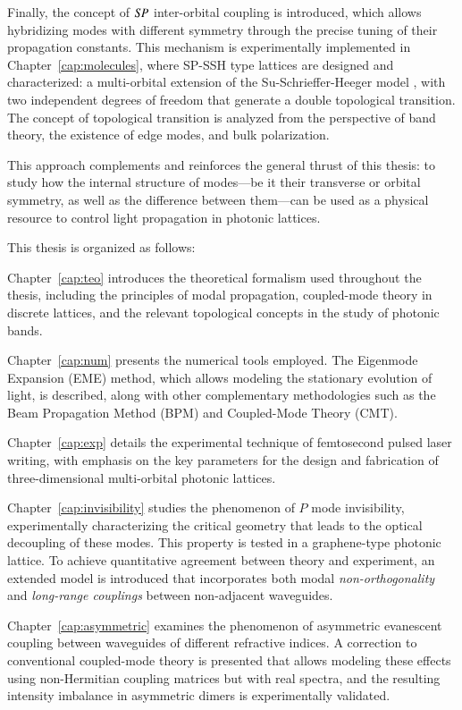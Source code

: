 Finally, the concept of $S\hspace{-0.3ex}P$ inter-orbital coupling is introduced, which allows hybridizing modes with different symmetry through the precise tuning of their propagation constants. This mechanism is experimentally implemented in Chapter~\ref{cap:molecules}, where SP-SSH type lattices are designed and characterized: a multi-orbital extension of the Su-Schrieffer-Heeger model \cite{ssh}, with two independent degrees of freedom that generate a double topological transition. The concept of topological transition is analyzed from the perspective of band theory, the existence of edge modes, and bulk polarization.

This approach complements and reinforces the general thrust of this thesis: to study how the internal structure of modes—be it their transverse or orbital symmetry, as well as the difference between them—can be used as a physical resource to control light propagation in photonic lattices.

\vspace{1em}

This thesis is organized as follows:

Chapter~\ref{cap:teo} introduces the theoretical formalism used throughout the thesis, including the principles of modal propagation, coupled-mode theory in discrete lattices, and the relevant topological concepts in the study of photonic bands.

Chapter~\ref{cap:num} presents the numerical tools employed. The Eigenmode Expansion (EME) method, which allows modeling the stationary evolution of light, is described, along with other complementary methodologies such as the Beam Propagation Method (BPM) and Coupled-Mode Theory (CMT).

Chapter~\ref{cap:exp} details the experimental technique of femtosecond pulsed laser writing, with emphasis on the key parameters for the design and fabrication of three-dimensional multi-orbital photonic lattices.

Chapter~\ref{cap:invisibility} studies the phenomenon of $P$ mode invisibility, experimentally characterizing the critical geometry that leads to the optical decoupling of these modes. This property is tested in a graphene-type photonic lattice. To achieve quantitative agreement between theory and experiment, an extended model is introduced that incorporates both modal \textit{non-orthogonality} and \textit{long-range couplings} between non-adjacent waveguides.

Chapter~\ref{cap:asymmetric} examines the phenomenon of asymmetric evanescent coupling between waveguides of different refractive indices. A correction to conventional coupled-mode theory is presented that allows modeling these effects using non-Hermitian coupling matrices but with real spectra, and the resulting intensity imbalance in asymmetric dimers is experimentally validated.

